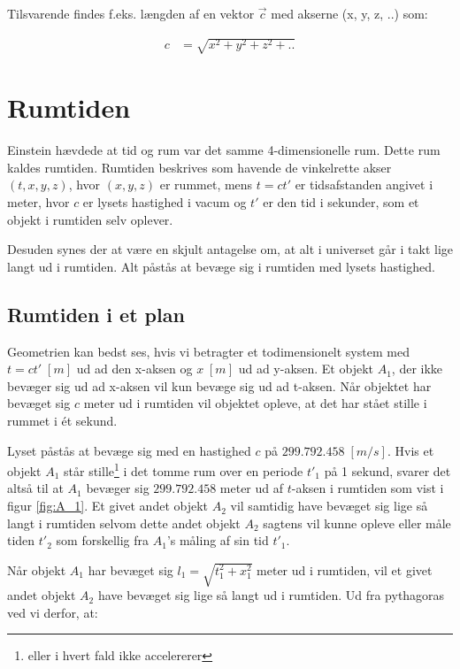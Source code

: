 \documentclass[11pt,a4paper]{memoir}
\begin{document}
Tilsvarende findes f.eks. længden af en vektor $\vec{c}$  med akserne (x, y, z, ..) som:

\begin{equation}
\begin{aligned}
c &= \sqrt{x^2 + y^2 + z^2 + ..}
\end{aligned}
\end{equation}

\FloatBarrier
\section{Rumtiden}
Einstein hævdede at tid og rum var det samme 4-dimensionelle rum. Dette rum kaldes rumtiden. Rumtiden beskrives som havende de vinkelrette akser $(t, x, y, z)$, hvor $(x, y, z)$ er rummet, mens $t = ct'$ er tidsafstanden angivet i meter, hvor $c$ er lysets hastighed i vacum og $t'$ er den tid i sekunder, som et objekt i rumtiden selv oplever.
\par
Desuden synes der at være en skjult antagelse om, at alt i universet går i takt lige langt ud i rumtiden. Alt påstås at bevæge sig i rumtiden med lysets hastighed.

\subsection{Rumtiden i et plan}
Geometrien kan bedst ses, hvis vi betragter et todimensionelt system med $t = ct'\;[m]$ ud ad den x-aksen og $x\;[m]$ ud ad y-aksen. Et objekt $A_1$, der ikke bevæger sig ud ad x-aksen vil kun bevæge sig ud ad t-aksen. Når objektet har bevæget sig $c$ meter ud i rumtiden vil objektet opleve, at det har stået stille i rummet i ét sekund.
\par
Lyset påstås at bevæge sig med en hastighed $c$ på $299.792.458\;[m/s]$. Hvis et objekt $A_1$ står stille\footnote{eller i hvert fald ikke accelererer} i det tomme rum over en periode  $t'_1$ på 1 sekund, svarer det altså til at $A_1$ bevæger sig $299.792.458$ meter ud af $t$-aksen i rumtiden som vist i figur \ref{fig:A_1}. Et givet andet objekt $A_2$ vil samtidig have bevæget sig lige så langt i rumtiden selvom dette andet objekt $A_2$ sagtens vil kunne opleve eller måle tiden $t'_2$ som forskellig fra $A_1$'s måling af sin tid $t'_1$.
\par
Når objekt $A_1$ har bevæget sig $l_1 = \sqrt{t_1^2 + x_1^2}$ meter ud i rumtiden, vil et givet andet objekt $A_2$ have bevæget sig lige så langt ud i rumtiden. Ud fra pythagoras ved vi derfor, at:
\end{document}
